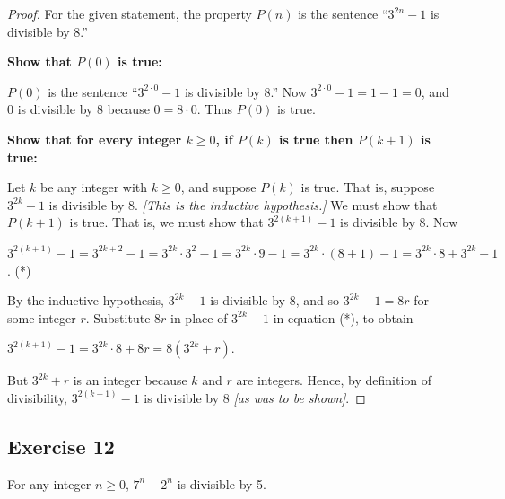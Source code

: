 \documentclass[14pt]{extarticle}
\begin{document}
\begin{proof}
For the given statement, the property $P(n)$ is the sentence “$3^{2n} - 1$ is divisible by 8.” 

{\bf Show that $P(0)$ is true:} 

$P(0)$ is the sentence “$3^{2 \cdot 0} - 1$ is divisible by 8.” Now $3^{2 \cdot 0} - 1 = 1 - 1 = 0$, and 0 is divisible by 8 because $0 = 8 \cdot 0$. Thus $P(0)$ is true. 

{\bf Show that for every integer $k \geq 0$, if $P(k)$ is true then $P(k + 1)$ is true:} 

Let $k$ be any integer with $k \geq 0$, and suppose $P(k)$ is true. That is, suppose $3^{2k} - 1$ is divisible by 8. {\it [This is the inductive hypothesis.]} We must show that $P(k + 1)$ is true. That is, we must show that $3^{2(k+1)} - 1$ is divisible by 8. Now 

$3^{2(k+1)} - 1 = 3^{2k+2} - 1 = 3^{2k} \cdot 3^2 - 1 = 3^{2k} \cdot 9 - 1 = 3^{2k} \cdot (8+1) - 1 = 3^{2k} \cdot 8 + 3^{2k} - 1$. (*) 

By the inductive hypothesis, $3^{2k} - 1$ is divisible by 8, and so $3^{2k} - 1 = 8r$ for some integer $r$. Substitute $8r$ in place of $3^{2k} - 1$ in equation (*), to obtain 

$3^{2(k+1)} - 1 = 3^{2k} \cdot 8 + 8r = 8(3^{2k} + r)$. 

But $3^{2k} + r$ is an integer because $k$ and $r$ are integers. Hence, by definition of divisibility, $3^{2(k+1)} - 1$ is divisible by 8 {\it [as was to be shown]}.
\end{proof}

\subsection{Exercise 12}
For any integer $n \geq 0$, $7^n - 2^n$ is divisible by 5.
\end{document}
